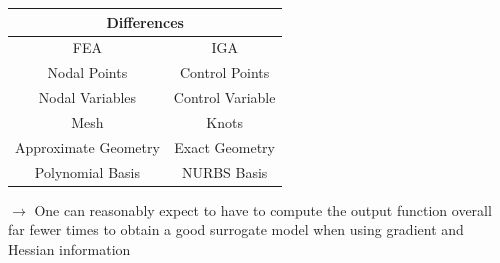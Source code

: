\documentclass{beamer}
\begin{document}
\begin{frame}[allowframebreaks]
\begin{itemize}
\newpage
\begin{center}
\begin{tabular}{cc}
\hline
\hline
 \multicolumn{2}{c}{Differences}\\
\hline
 \footnotesize{FEA} & \footnotesize{IGA} \\
\hline 
 \footnotesize{Nodal Points} & \footnotesize{Control Points} \\
 \footnotesize{Nodal Variables} & \footnotesize{Control Variable}\\
 \footnotesize{Mesh} & \footnotesize{Knots} \\
 \footnotesize{Approximate Geometry} & \footnotesize{Exact Geometry}\\
 \footnotesize{Polynomial Basis} & \footnotesize{NURBS Basis} \\
\hline
\hline
\end{tabular}
\end{center}

$\rightarrow$ One can reasonably expect to have to compute the output function overall far fewer times to obtain a good surrogate model when using gradient and Hessian information

\end{itemize}
\end{frame}


\end{document}
